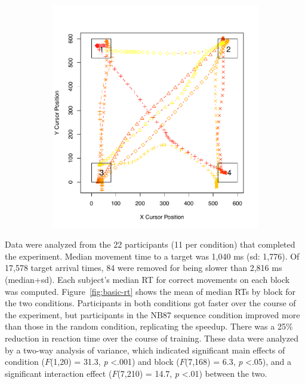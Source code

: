 \documentclass[man,floatsintext]{apa6}
\begin{document}
\begin{figure}[t]
\begin{subfigure}[t]{0.49\textwidth}
                \includegraphics[width=.95\textwidth]{figures/1trial_s6tr5_NB87}
        \end{subfigure}
        \label{fig:ex-trial}
\end{figure}

\addtocounter{figure}{-1}

Data were analyzed from the 22 participants (11 per condition) that completed the experiment. Median movement time to a target was 1,040 ms (sd: 1,776). Of 17,578 target arrival times, 84 were removed for being slower than 2,816 ms (median+sd). Each subject's median RT for correct movements on each block was computed. Figure~\ref{fig:basic-rt} shows the mean of median RTs by block for the two conditions. Participants in both conditions got faster over the course of the experiment, but participants in the NB87 sequence condition improved more than those in the random condition, replicating the  speedup. There was a 25\% reduction in reaction time over the course of training. These data were analyzed by a two-way analysis of variance, which indicated significant main effects of condition ($F$(1,20) = 31.3, \textit{p} \textless .001) and block ($F$(7,168) = 6.3, \textit{p} \textless .05), and a significant interaction effect ($F$(7,210) = 14.7, \textit{p} \textless .01) between the two.
\end{document}
